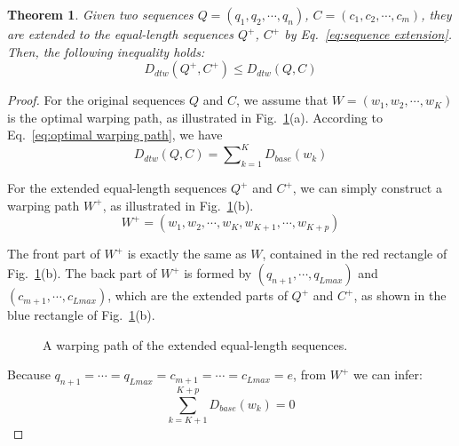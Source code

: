\documentclass[10pt,journal,compsoc]{IEEEtran}
\newtheorem{theorem}{Theorem}
\begin{document}
\begin{theorem} \label{theorem:5}
  Given two sequences $Q=(q_1, q_2, \cdots, q_n)$, $C=(c_1, c_2, \cdots, c_m)$,
  they are extended to the equal-length sequences $Q^+$, $C^+$ by Eq.~\eqref{eq:sequence extension}.
  Then, the following inequality holds:
  \begin{equation}\label{eq:path extension theorem 1}
    D_{dtw}(Q^+,C^+)\leq D_{dtw}(Q,C)
  \end{equation}
\end{theorem}

\begin{proof}
For the original sequences $Q$ and $C$,
we assume that $W=(w_1,w_2, \cdots,w_K)$ is the optimal warping path,
as illustrated in Fig.~\ref{fig:equal-length extension}(a).
According to Eq.~\eqref{eq:optimal warping path}, we have
\begin{equation}\label{eq:path extension proof 1}
    D_{dtw}(Q,C) = \sum\nolimits_{k=1}^K {D_{base}{(w_k)}}
\end{equation}

For the extended equal-length sequences $Q^+$ and $C^+$,
we can simply construct a warping path $W^+$,
as illustrated in Fig.~\ref{fig:equal-length extension}(b).
\begin{equation}\label{eq:path extension proof 2}
    W^+=(w_1,w_2,\cdots,w_K,w_{K+1},\cdots,w_{K+p})
\end{equation}

The front part of $W^+$ is exactly the same as $W$,
contained in the red rectangle of Fig.~\ref{fig:equal-length extension}(b).
The back part of $W^+$ is formed by $(q_{n+1},\cdots,q_{Lmax})$ and $(c_{m+1},\cdots,c_{Lmax})$,
which are the extended parts of $Q^+$ and $C^+$,
as shown in the blue rectangle of Fig.~\ref{fig:equal-length extension}(b).

\begin{figure}[!htbp]
\centering
{}
\caption{A warping path of the extended equal-length sequences.}
\label{fig:equal-length extension}
\end{figure}

Because $q_{n+1}=\cdots=q_{Lmax}=c_{m+1}=\cdots=c_{Lmax}=e$,
from $W^+$ we can infer:
\begin{equation}\label{eq:path extension proof 3}
    \sum_{k=K+1}^{K+p} D_{base}(w_k)=0
\end{equation}


\end{proof}
\end{document}
